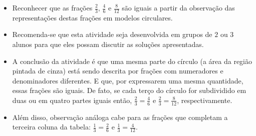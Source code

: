 \begin{atividade}\label{chap4-ativ5}
\objetivos
\begin{itemize} %
    \item       Reconhecer que as frações $\frac{2}{3}$, $\frac{4}{6}$ e $\frac{8}{12}$ são iguais a partir da observação das representações destas frações em modelos circulares.
\end{itemize} %

\discussoes
\begin{itemize} %
    \item       Recomenda-se que esta atividade seja desenvolvida em grupos de
    $2$       ou       $3$       alunos para que eles possam discutir as
soluções apresentadas.
    \item   A conclusão da atividade é que uma mesma parte do círculo (a área da região pintada de cinza) está sendo descrita por frações com numeradores e denominadores diferentes. E que, por expressarem uma mesma quantidade, essas frações são iguais. De fato, se cada terço do círculo for subdividido em duas ou em quatro partes iguais então, $\frac{2}{3} = \frac{4}{6}$ e $\frac{2}{3} = \frac{8}{12}$, respectivamente.
    \item       Além disso, observação análoga cabe para as frações que
completam a terceira coluna da tabela:       $\frac{1}{3}=\frac{2}{6}$       e       $\frac{1}{3}=\frac{4}{12}$.
\end{itemize} %

\solucao
\newcommand\fit[1]{\parbox[c][1.5\baselineskip]{\linewidth}{\centering#1}}


\end{atividade}
